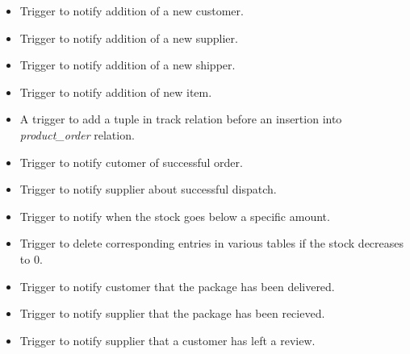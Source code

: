 \documentclass[a4paper,12pt]{article} %
\begin{document}
\begin{itemize}
    \item Trigger to notify addition of a new customer.
    \item Trigger to notify addition of a new supplier.
    \item Trigger to notify addition of a new shipper.
    \item Trigger to notify addition of new item.
    \item A trigger to add a tuple in track relation before an insertion into \textit{product\_order} relation.
    \item Trigger to notify cutomer of successful order.
    \item Trigger to notify supplier about successful dispatch.
    \item Trigger to notify when the stock goes below a specific amount.
    \item Trigger to delete corresponding entries in various tables if the stock decreases to 0.
    \item Trigger to notify customer that the package has been delivered.
    \item Trigger to notify supplier that the package has been recieved.
    \item Trigger to notify supplier that a customer has left a review.
\end{itemize}
\end{document}
